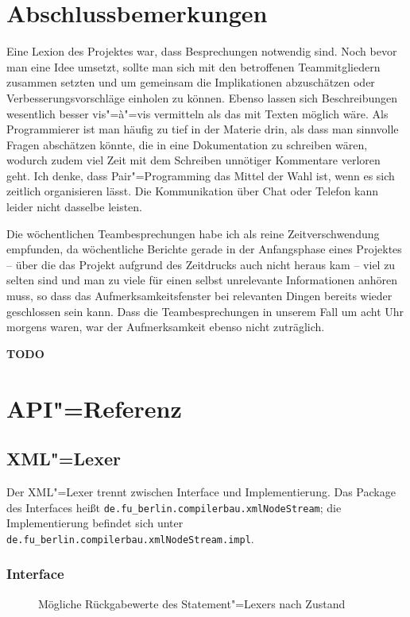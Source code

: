 \documentclass[10pt,a4paper,ngerman,titlepage,tocindentauto]{scrartcl}
\newcommand{\TODO}{ {\LARGE\bf\color{crimson} TODO} }
\newcommand{\n}{\linebreak[1]}
\begin{document}
	\section[Abschlussbemerkungen]{\hypertarget{Abschlussbemerkungen}{Abschlussbemerkungen}}
		Eine Lexion des Projektes war, dass Besprechungen notwendig sind. Noch bevor man eine Idee umsetzt, sollte man
		sich mit den betroffenen Teammitgliedern zusammen setzten und um gemeinsam die Implikationen abzuschätzen
		oder Verbesserungsvorschläge einholen zu können. Ebenso lassen sich Beschreibungen wesentlich besser vis"=à"=vis
		vermitteln als das mit Texten möglich wäre. Als Programmierer ist man häufig zu tief in der Materie drin, als dass
		man sinnvolle Fragen abschätzen könnte, die in eine Dokumentation zu schreiben wären, wodurch zudem viel Zeit
		mit dem Schreiben unnötiger Kommentare verloren geht. Ich denke, dass Pair"=Programming das Mittel der Wahl ist,
		wenn es sich zeitlich organisieren lässt. Die Kommunikation über Chat oder Telefon kann leider nicht dasselbe leisten.
		
		Die wöchentlichen Teambesprechungen habe ich als reine Zeitverschwendung empfunden, da wöchentliche
		Berichte gerade in der Anfangsphase eines Projektes -- über die das Projekt aufgrund des Zeitdrucks
		auch nicht heraus kam -- viel zu selten sind und man zu viele für einen selbst unrelevante Informationen
		anhören muss, so dass das Aufmerksamkeitsfenster bei relevanten Dingen bereits wieder geschlossen
		sein kann. Dass die Teambesprechungen in unserem Fall um acht Uhr morgens waren, war der Aufmerksamkeit
		ebenso nicht zuträglich.
		
		\TODO
		
	\section{API"=Referenz}
		\subsection[XML-Lexer]{\hypertarget{XML-Lexer-API}{XML"=Lexer}}
			Der XML"=Lexer trennt zwischen Interface und Implementierung.
			Das Package des Interfaces heißt \texttt{de.{\n}fu\_berlin.{\n}compilerbau.{\n}xmlNodeStream};
			die Implementierung befindet sich unter \texttt{de.{\n}fu\_berlin.{\n}compilerbau.{\n}xmlNodeStream.{\n}impl}.
			
			\subsubsection*{Interface}
				\begin{wrapfigure}{R}{0.3\textwidth}
					\vspace{-22pt}
					\caption{Mög\-li\-che Rück\-ga\-be\-wer\-te des State\-ment"=Le\-xers nach Zu\-stand}
					\vspace{-30pt}
				\end{wrapfigure}
				
\end{document}
